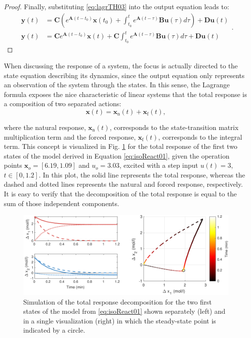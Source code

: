 \documentclass[a4paper,11pt]{book}
\numberwithin{figure}{chapter}
\numberwithin{equation}{chapter}
\numberwithin{table}{chapter}
\theoremstyle{definition}
\begin{document}
\begin{proof}
    Finally, substituting \eqref{eq:lagrTH03} into the output equation leads to:
    \begin{equation} \label{eq:lagrTH04}
    \begin{split}
        \bm{y}(t) &= \bm{C} \left( e^{\bm{A} (t - t_0)} \bm{x}(t_0) + \int_{t_0}^{t} e^{\bm{A}(t - \tau)} \bm{B} \bm{u}(\tau) d\tau \right) + \bm{D} \bm{u}(t) \\ 
        \bm{y}(t) &= \bm{C} e^{\bm{A}(t - t_0)} \bm{x}(t) + \bm{C} \int_{t_0}^{t} e^{\bm{A}(t - \tau)} \bm{B} \bm{u}(\tau) d \tau + \bm{D} \bm{u}(t) 
    \end{split}
    .\end{equation}
\end{proof}

When discussing the response of a system, the focus is actually directed to the state equation describing its dynamics, since the output equation only represents an observation of the system through the states. In this sense, the Lagrange formula exposes the nice characteristic of linear systems that the total response is a composition of two separated actions:
\begin{equation}
    \bm{x}(t) = \bm{x}_{\text{n}}(t) + \bm{x}_{\text{f}}(t) 
,\end{equation}

\noindent where the natural response, $\bm{x}_{\text{n}}(t)$, corresponds to the state-transition matrix multiplication term and the forced response, $\bm{x}_{\text{f}}(t)$, corresponds to the integral term. This concept is visualized in Fig. \ref{fig:linResp02} for the total response of the first two states of the model derived in Equation \eqref{eq:isoReact01}, given the operation points $\bm{x}_o = [6.19, 1.09]$ and $u_o = 3.03$, excited with a step input $u(t) = 3$, $t \in [0, 1.2]$. In this plot, the solid line represents the total response, whereas the dashed and dotted lines represents the natural and forced response, respectively. It is easy to verify that the decomposition of the total response is equal to the sum of those independent components.

\begin{figure}[ht]
    \centering
    \includegraphics[width=\textwidth]{chapter2/linResp02}
    \caption{Simulation of the total response decomposition for the two first states of the model from \eqref{eq:isoReact01} shown separately (left) and in a single visualization (right) in which the steady-state point is indicated by a circle.}
    \label{fig:linResp02}
\end{figure}
\end{document}
